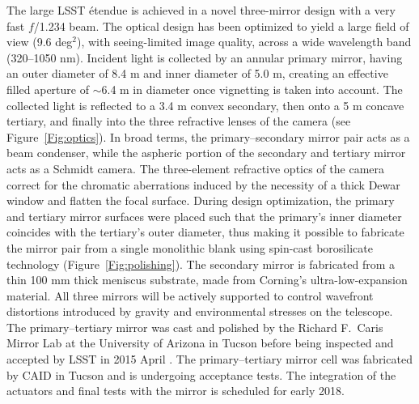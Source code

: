 The large LSST \'etendue is achieved in a novel three-mirror design
\citep[modified Paul-Baker Mersenne-Schmidt system;][]{2000ASPC..195...81A} with a very fast $f$/1.234 beam. The optical
design has been optimized to yield a large field of view (9.6 deg$^2$),
with seeing-limited image quality, across a wide wavelength band (320--1050
nm). Incident light is collected by an annular primary mirror, having
an outer diameter of 8.4 m and inner diameter of 5.0 m, creating an effective filled aperture of
$\sim$6.4 m in diameter once vignetting is taken into account. The
collected light is reflected to a 3.4 m convex secondary, then onto
a 5 m concave tertiary, and finally  into the three refractive lenses of the camera (see Figure~\ref{Fig:optics}).
In broad terms, the primary--secondary mirror pair acts as a beam condenser, while the aspheric portion of
the secondary and tertiary mirror acts as a Schmidt camera.  The three-element refractive optics of the camera
correct for the chromatic aberrations induced by the necessity of a thick Dewar window and flatten the
focal surface.  During design optimization, the primary and tertiary mirror surfaces were placed such that the primary's
inner diameter coincides with the tertiary's outer diameter, thus making it possible to fabricate the mirror pair from a
single monolithic blank using spin-cast borosilicate technology (Figure~\ref{Fig:polishing}). The secondary mirror is fabricated from
a thin 100 mm thick meniscus substrate, made from Corning's ultra-low-expansion material. All
three mirrors will be actively supported to control wavefront distortions
introduced by gravity and environmental stresses on the telescope.
The primary--tertiary mirror was cast and polished
by the Richard F.\ Caris Mirror Lab at the University of Arizona in Tucson
before being inspected and accepted by LSST in 2015 April
\citep{2016SPIE.9906E..0LA}. The  primary--tertiary mirror cell was
fabricated by CAID in Tucson and is undergoing acceptance tests. The
integration of the actuators and final tests with the mirror is
scheduled for early 2018.


